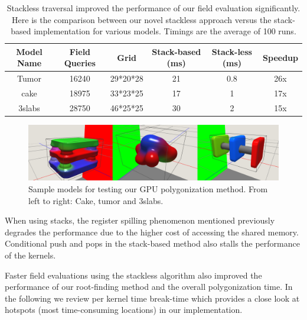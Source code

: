 \begin{table}[H]
\begin{center}
	 \caption{\label{table:stackless}
  {Stackless \blob traversal improved the performance of our \blob field evaluation significantly.
  Here is the comparison between our novel stackless approach versus the stack-based implementation for various models. 
  Timings are the average of 100 runs.}
}
  \begin{tabular}{ | c | c | c | c | c | c |}
    \hline    
    Model Name & Field Queries & Grid & Stack-based (ms) & Stack-less (ms) & Speedup \\ \hline \hline
    Tumor & 16240 & 29*20*28 & 21 & 0.8 & 26x\\ \hline
    cake & 18975 & 33*23*25 & 17 & 1 & 17x\\ \hline
    3slabs & 28750 & 46*25*25 & 30 & 2 & 15x \\ \hline
    \hline
  \end{tabular}
\end{center}
\end{table}


\begin{figure}[H]
  \centering
  \includegraphics[width=1.0\linewidth]{figures/gpupoly/combined_models.png}
  \caption{\label{fig:combinedmodels}
  {Sample models for testing our GPU polygonization method. From left to right: Cake, tumor and 3slabs.}
}
\end{figure}

When using stacks, the register spilling phenomenon mentioned previously degrades the performance due to the higher cost of accessing 
the shared memory. Conditional push and pops in the stack-based method also stalls the performance of the kernels.  

Faster field evaluations using the stackless algorithm also improved the performance of our root-finding method and the overall
polygonization time. In the following we review per kernel time break-time which provides a close look at hotspots (most time-consuming 
locations) in our implementation. 

